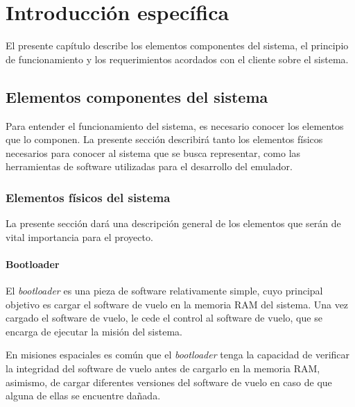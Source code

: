 \chapter{Introducción específica} %
\label{Chapter2}

El presente capítulo describe los elementos componentes del sistema, el principio de funcionamiento y los requerimientos acordados con el cliente sobre el sistema.





\section{Elementos componentes del sistema}
\label{sec:elementos_componentes_sistema}

Para entender el funcionamiento del sistema, es necesario conocer los elementos que lo componen. La presente sección describirá tanto los elementos físicos necesarios para conocer al sistema que se busca representar, como las herramientas de software utilizadas para el desarrollo del emulador.

\subsection{Elementos físicos del sistema}
\label{subsec:elementos_fisicos}

La presente sección dará una descripción general de los elementos que serán de vital importancia para el proyecto.

\subsubsection{Bootloader}
\label{subsec:bootloader}

El \textit{bootloader} es una pieza de software relativamente simple, cuyo principal objetivo es cargar el software de vuelo en la memoria RAM del sistema. Una vez cargado el software de vuelo, le cede el control al software de vuelo, que se encarga de ejecutar la misión del sistema.

En misiones espaciales es común que el \textit{bootloader} tenga la capacidad de verificar la integridad del software de vuelo antes de cargarlo en la memoria RAM, asimismo, de cargar diferentes versiones del software de vuelo en caso de que alguna de ellas se encuentre dañada.

